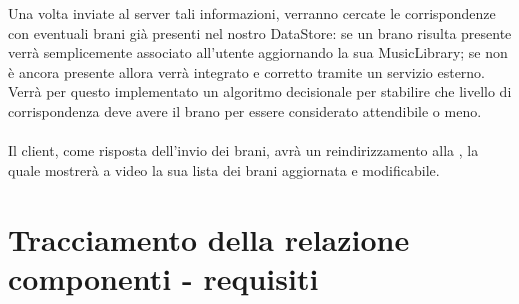 Una volta inviate al server tali informazioni, verranno cercate le
corrispondenze con eventuali brani gi\`a presenti nel nostro DataStore: se un
brano risulta presente verr\`a semplicemente associato all'utente aggiornando la
sua MusicLibrary; se non \`e ancora presente allora verr\`a integrato e corretto
tramite un servizio esterno. Verr\`a per questo implementato un algoritmo
decisionale per stabilire che livello di corrispondenza deve avere il brano per
essere considerato attendibile o meno.\\
\\
Il client, come risposta dell'invio dei brani, avr\`a un reindirizzamento alla
, la quale mostrer\`a a video la sua lista dei brani
aggiornata e modificabile.

\chapter{Tracciamento della relazione componenti - requisiti}

